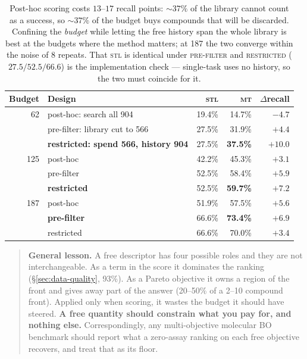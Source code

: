 \documentclass[11pt]{article}
\newcommand{\stl}{\textsc{stl}}
\newcommand{\mt}{\textsc{mt}}
\begin{document}
\begin{table}[ht]
\centering\small
\begin{tabular}{rlrrr}
\toprule
Budget & Design & \stl{} & \mt{} & $\Delta$recall \\
\midrule
62  & post-hoc: search all 904            & 19.4\% & 14.7\% & $-4.7$ \\
    & pre-filter: library cut to 566      & 27.5\% & 31.9\% & $+4.4$ \\
    & \textbf{restricted: spend 566, history 904} & 27.5\% & \textbf{37.5\%} & $\mathbf{+10.0}$ \\
\midrule
125 & post-hoc                            & 42.2\% & 45.3\% & $+3.1$ \\
    & pre-filter                          & 52.5\% & 58.4\% & $+5.9$ \\
    & \textbf{restricted}                 & 52.5\% & \textbf{59.7\%} & $+7.2$ \\
\midrule
187 & post-hoc                            & 51.9\% & 57.5\% & $+5.6$ \\
    & \textbf{pre-filter}                 & 66.6\% & \textbf{73.4\%} & $+6.9$ \\
    & restricted                          & 66.6\% & 70.0\% & $+3.4$ \\
\bottomrule
\end{tabular}
\caption{Post-hoc scoring costs $13$--$17$ recall points: ${\sim}37\%$ of the
library cannot count as a success, so ${\sim}37\%$ of the budget buys compounds
that will be discarded. Confining the \emph{budget} while letting the free
history span the whole library is best at the budgets where the method matters;
at 187 the two converge within the noise of 8 repeats. That \stl{} is identical
under \textsc{pre-filter} and \textsc{restricted} ($27.5/52.5/66.6$) is the
implementation check --- single-task uses no history, so the two must coincide
for it.}
\label{tab:where}
\end{table}

\begin{quote}
\textbf{General lesson.} A free descriptor has four possible roles and they are
not interchangeable. As a term in the score it dominates the ranking
(\S\ref{sec:data-quality}, 93\%). As a Pareto objective it owns a region of the
front and gives away part of the answer (20--50\% of a 2--10 compound front).
Applied only when scoring, it wastes the budget it should have steered.
\textbf{A free quantity should constrain what you pay for, and nothing else.}
Correspondingly, any multi-objective molecular BO benchmark should report what a
zero-assay ranking on each free objective recovers, and treat that as its floor.
\end{quote}
\end{document}
